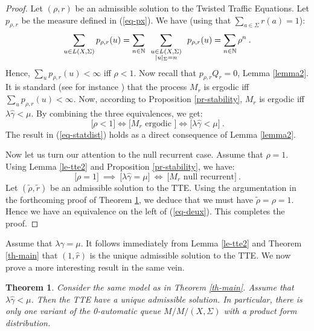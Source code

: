\documentclass[11pt,a4paper]{article}
\newcommand{\bdl}[2]
{\mbox{$
\renewcommand{\arraystretch}{0.5}
\begin{array}{c}{\scriptstyle #1}\\ {\scriptstyle #2} \end{array}
\renewcommand{\arraystretch}{2}
       $}}
\newtheorem{theorem}{Theorem}[section]
\theoremstyle{remark}
\def\Blackboardfont{\mathbb}
\def\N{{\Blackboardfont N}}
\def\iff{\Longleftrightarrow}
\def\eref#1{(\ref{#1})}
\begin{document}
\begin{proof}
Let $(\rho,r)$ be an admissible solution to the Twisted Traffic
Equations. Let $p_{\rho,r}$ be the measure
defined in \eref{eq-px}.
We have (using that $\sum_{a\in \Sigma} r(a) =1$):
\[
\sum_{u\in L(X,\Sigma)} p_{\rho,r}(u) = \sum_{n\in \N}\sum_{\bdl{u\in
    L(X,\Sigma)}{|u|_{\Sigma}=n}} p_{\rho,r}(u) = \sum_{n\in \N} \rho^n \:.
\]
Hence, $\sum_u p_{\rho,r}(u)<\infty$ iff $\rho<1$. Now recall that
$p_{\rho,r} Q_r =0$, Lemma \ref{lemma2}.
It is standard (see for instance \cite[Chapter 8]{brem99})
that the process $M_r$ is ergodic iff $\sum_u
p_{\rho,r}(u) <\infty$.
Now, according to Proposition \ref{pr-stability},
$M_r$ is ergodic iff $\lambda\widehat{\gamma} <\mu$. By
combining the three equivalences, we get:
\begin{equation*}
 \bigl[\rho < 1\bigr]  \iff \bigl[ M_r \text{ ergodic } \bigr] \iff
 \bigl[\lambda \widehat{\gamma} < \mu\bigr] \:.
\end{equation*}
The result in \eref{eq-statdist} holds as a direct consequence of Lemma
\ref{lemma2}.

Now let us turn our attention to the null recurrent case. Assume that
$\rho=1$.
Using Lemma \ref{le-tte2} and Proposition \ref{pr-stability}, we have:
\begin{equation}\label{eq-deux}
\bigl[ \rho = 1 \bigr] \ \implies \  \bigl[ \lambda\widehat{\gamma} = \mu
  \bigr] \ \iff \ \bigl[ M_r \text{ null recurrent} ] \:.
\end{equation}
Let $(\widetilde{\rho},
\widetilde{r})$ be an admissible  solution to the TTE. Using the
argumentation in the forthcoming proof of
Theorem \ref{th-uniq}, we deduce that we must have
$\widetilde{\rho}=\rho=1$. Hence we have an equivalence on
the left of \eref{eq-deux}. This completes the proof.
\end{proof}





Assume that $\lambda\widehat{\gamma} = \mu$.
It follows immediately from Lemma \ref{le-tte2} and Theorem \ref{th-main}
that $(1,\widehat{r})$ is the unique admissible solution to the
TTE. We now prove a more interesting result in the same vein.


\begin{theorem}\label{th-uniq}
Consider the same model as in Theorem \ref{th-main}. Assume that
$\lambda \widehat{\gamma} < \mu$. Then the TTE have a unique
admissible solution. In particular, there is only one variant of
the 0-automatic queue $M/M/(X,\Sigma)$ with a product form
distribution.
\end{theorem}
\end{document}
